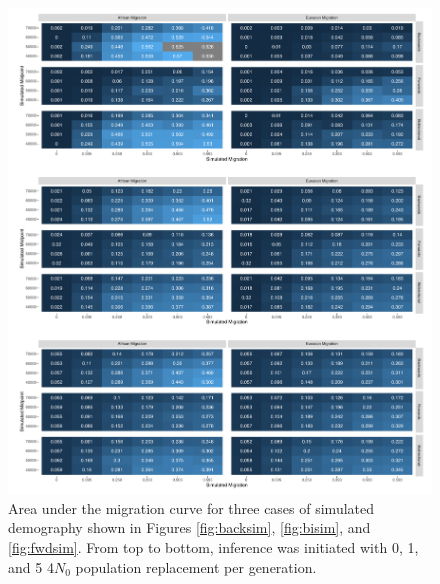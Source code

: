 \documentclass{article}
\begin{document}
\begin{figure}
	\centering
	\includegraphics[width=\textwidth]{plot/all_integrated_sims.pdf}
	\caption{Area under the migration curve for three cases of simulated demography shown in Figures \ref{fig:backsim}, \ref{fig:bisim}, and \ref{fig:fwdsim}. From top to bottom, inference was initiated with 0, 1, and 5 4$N_0$ population replacement per generation.}
	\label{fig:intsim}
\end{figure}



\end{document}
